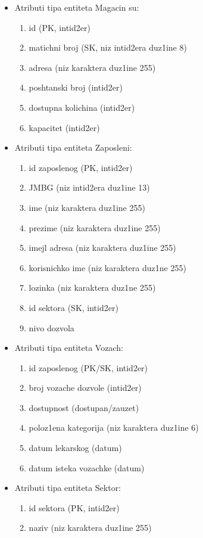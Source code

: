 \begin{itemize}
\item
Atributi tipa entiteta Magacin su:
\begin{enumerate}
    \item{id (PK, intid2er)}
    \item{matichni broj (SK, niz intid2era duz1ine 8)}
    \item{adresa (niz karaktera duz1ine 255)}
    \item{poshtanski broj (intid2er)}
    \item{dostupna kolichina (intid2er)}
    \item{kapacitet (intid2er)}
\end{enumerate}
\item
Atributi tipa entiteta Zaposleni:
\begin{enumerate}
    \item {id zaposlenog (PK, intid2er)}
    \item{JMBG (niz intid2era duz1ine 13)}
    \item{ime (niz karaktera duz1ine 255)}
    \item{prezime (niz karaktera duz1ine 255)}
    \item{imejl adresa (niz karaktera duz1ine 255)}
    \item{korisnichko ime (niz karaktera duz1ne 255)}
    \item{lozinka (niz karaktera duz1ne 255)}
    \item{id sektora (SK, intid2er)}
    \item{nivo dozvola}
\end{enumerate}
\item
Atributi tipa entiteta Vozach:
\begin{enumerate}
    \item {id zaposlenog (PK/SK, intid2er)}
    \item{broj vozache dozvole (intid2er)}
    \item{dostupnost (dostupan/zauzet)}
    \item{poloz1ena kategorija (niz karaktera duz1ine 6)}
    \item{datum lekarskog (datum)}
    \item{datum isteka vozachke (datum)}
\end{enumerate}
\item
Atributi tipa entiteta Sektor:
\begin{enumerate}
    \item {id sektora (PK, intid2er)}
    \item{naziv (niz karaktera duz1ine 255)}

\end{enumerate}
\end{itemize}

